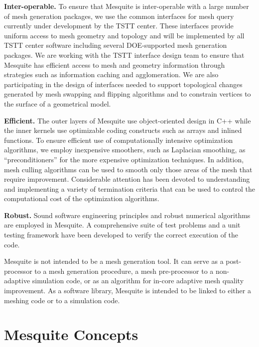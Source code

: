 {\bf Inter-operable.}  To ensure that Mesquite is inter-operable with a
large number of mesh generation packages, we use the common
interfaces for mesh query currently under development by the TSTT
center.  These interfaces provide uniform access to mesh geometry and
topology and will be implemented by all TSTT center software including
several DOE-supported mesh generation packages.  We are working with
the TSTT interface design team to ensure that Mesquite has efficient
access to mesh and geometry information through strategies such as
information caching and agglomeration.  We are also participating in
the design of interfaces needed to support topological changes
generated by mesh swapping and flipping algorithms and to constrain
vertices to the surface of a geometrical model. \newline

{\bf Efficient.}  The outer layers of Mesquite use 
object-oriented design in C++ while the inner kernels use
optimizable coding constructs such as arrays and inlined
functions.  To ensure efficient use of computationally intensive
optimization algorithms, we employ inexpensive smoothers, such as
Laplacian smoothing, as ``preconditioners'' for the more expensive
optimization techniques.  In addition, mesh culling algorithms can be
used to smooth only those areas of the mesh that require improvement.
Considerable attention has been devoted to understanding and
implementing a variety of termination criteria that can be used to
control the computational cost of the optimization algorithms. \newline

{\bf Robust.} Sound software engineering principles and robust numerical 
algorithms are employed in Mesquite. 
A comprehensive suite of test problems and a unit testing framework have
been developed to verify the correct execution of the code. \newline

Mesquite is not intended to be a mesh generation tool. It can serve as 
a post-processor to a mesh generation procedure, a mesh pre-processor to a 
non-adaptive simulation code, or as an algorithm for in-core adaptive mesh 
quality improvement. As a software library, Mesquite is intended to be
linked to either a meshing code or to a simulation code. \newline

\section{Mesquite Concepts} \label{sec:concepts}

